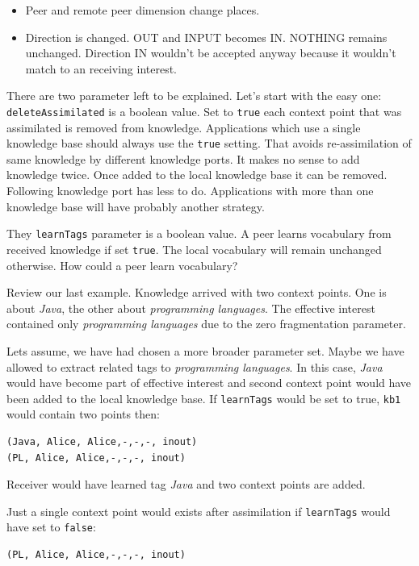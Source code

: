 \begin{itemize}
\item Peer and remote peer dimension change places.
\item Direction is changed. OUT and INPUT becomes IN. NOTHING remains unchanged. Direction IN wouldn't be accepted anyway because it wouldn't match to an receiving interest.
\end{itemize}

There are two parameter left to be explained. Let's start with the easy one:
{\tt deleteAssimilated} is a boolean value. Set to {\tt true} each context point that was assimilated is removed from knowledge. Applications which use a single knowledge base should always use the {\tt true} setting. That avoids re-assimilation of same knowledge by different knowledge ports. It makes no sense to add knowledge twice. Once added to the local knowledge base it can be removed. Following knowledge port has less to do. Applications with more than one knowledge base will have probably another strategy.

They {\tt learnTags} parameter is a boolean value. A peer learns vocabulary from received knowledge if set {\tt true}. The local vocabulary will remain unchanged otherwise. How could a peer learn vocabulary?

Review our last example. Knowledge arrived with two context points. One is about {\it Java}, the other about {\it programming languages}. The effective interest contained only {\it programming languages} due to the zero fragmentation parameter.

Lets assume, we have had chosen a more broader parameter set. Maybe we have allowed to extract related tags to {\it programming languages}. In this case, {\it Java} would have become part of effective interest and second context point would have been added to the local knowledge base. If {\tt learnTags} would be set to true, {\tt kb1} would contain two points then:

\begin{verbatim}
(Java, Alice, Alice,-,-,-, inout)
(PL, Alice, Alice,-,-,-, inout)
\end{verbatim}

Receiver would have learned tag {\it Java} and two context points are added.

Just a single context point would exists after assimilation if {\tt learnTags} would have set to {\tt false}:

\begin{verbatim}
(PL, Alice, Alice,-,-,-, inout)
\end{verbatim}

